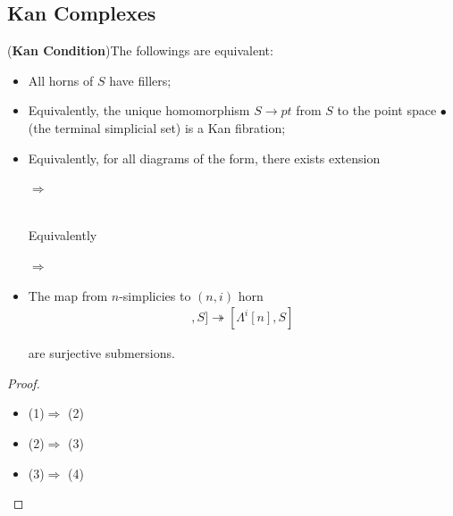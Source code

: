 \documentclass[Total.tex]{subfiles}
\begin{document}
			\subsection{Kan Complexes}
				\begin{lemma}
					(\textbf{Kan Condition})The followings are equivalent:
					\begin{itemize}
						\item All horns of $S$ have fillers;
						\item Equivalently, the unique homomorphism $S\rightarrow pt$ from $S$ to the point space $\bullet$ (the terminal simplicial set) is a Kan fibration;
						\item Equivalently, for all diagrams of the form, there exists extension
						\begin{center}
							$\Rightarrow$ \\
							Equivalently \qquad {}$\Rightarrow$ 
						\end{center}
						\item The map from $n$-simplicies to $(n,i)$ horn
						\begin{gather*}
							[\Delta[n],S]\twoheadrightarrow [\Lambda^i[n],S]
						\end{gather*}
						
						are surjective submersions.
					\end{itemize}
				\end{lemma}
				\begin{proof}
					\begin{itemize}
						\item (1)$\Rightarrow$ (2)
						\item (2)$\Rightarrow$ (3)
						\item (3)$\Rightarrow$ (4)
					\end{itemize}
				\end{proof}
				
\end{document}
